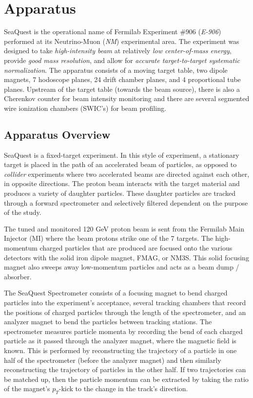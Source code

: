 \chapter{Apparatus}

SeaQuest is the operational name of Fermilab Experiment \#906 (\emph{E-906}) performed at its Neutrino-Muon (\emph{NM})
experimental area. The experiment was designed
to take \emph{high-intensity beam} at relatively \emph{low center-of-mass energy}, provide
\emph{good mass resolution}, and allow for \emph{accurate target-to-target systematic normalization}.
The apparatus consists of a moving target table, two dipole magnets, 7 hodoscope planes, 24 drift 
chamber planes, and 4 proportional tube planes. Upstream of the target table (towards the beam source),
there is also a Cherenkov counter for beam intensity monitoring and there are
several segmented wire ionization chambers (SWIC's) for beam profiling.

\section{Apparatus Overview}

SeaQuest is a fixed-target experiment. In this style of
experiment, a stationary target is placed in the path of an accelerated beam of particles, as opposed to \emph{collider} 
experiments where two accelerated beams are directed against each other, in opposite directions. The proton beam
interacts with the target material and produces a variety of daughter particles. These daughter particles are 
tracked through a forward spectrometer and selectively filtered dependent on the purpose of the study.

The tuned and monitored 120 GeV proton beam is sent from the Fermilab Main Injector (MI) where the beam
protons strike one of the 7 targets. The high-momentum charged particles that are produced are focused
onto the various detectors with the solid iron dipole magnet, FMAG, or NM3S. 
This solid focusing magnet also sweeps away low-momentum particles and acts as a beam dump / absorber.

The SeaQuest Spectrometer consists of a focusing magnet to bend charged particles into the experiment's acceptance,
several tracking chambers that record the positions of charged particles through the length of the spectrometer, and
an analyzer magnet to bend the particles between tracking stations. The spectrometer measures particle momenta by
recording the bend of each charged particle as it passed through the analyzer magnet, where the magnetic field is known.
This is performed by reconstructing the trajectory of a particle in one half of the spectrometer (before the
analyzer magnet) and then similarly reconstructing the trajectory of particles in the other half. If two 
trajectories can be matched up, then the particle momentum can be extracted by taking the ratio of the 
magnet's $p_T$-kick to the change in the track's direction.

